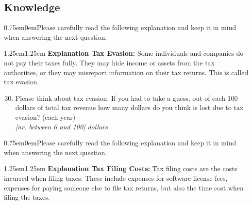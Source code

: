 \documentclass[11pt]{article}
\newcommand{\tk}[1]{\textcolor{orange}{#1}}
\begin{document}
\subsection*{Knowledge}
\begin{adjustwidth}{0.75em}{0em}Please carefully read the following explanation and keep it in mind when answering the next question.\end{adjustwidth} 
\vspace{0.5em}
\begin{adjustwidth}{1.25em}{1.25em} 
\textbf{Explanation Tax Evasion:} Some individuals and companies do not pay their taxes fully. They may hide income or assets from the tax authorities, or they may misreport information on their tax returns. This is called tax evasion. 
\end{adjustwidth}
\begin{enumerate}[resume]
    \setcounter{enumi}{29}
    \item Please think about tax evasion. If you had to take a guess, out of each 100 dollars of total tax revenue how many dollars do you think is lost due to tax evasion? (each year) \\
    \textit{[nr. between 0 and 100] dollars} 
\end{enumerate}
\begin{adjustwidth}{0.75em}{0em}Please carefully read the following explanation and keep it in mind when answering the next question.\end{adjustwidth}
\vspace{0.5em}
\begin{adjustwidth}{1.25em}{1.25em} \textbf{Explanation Tax Filing Costs:} Tax filing costs are the costs incurred when filing taxes. These include expenses for software license fees, expenses for paying someone else to file tax returns, but also the time cost when filing the taxes. 
\end{adjustwidth}
\vspace{0.5em}
\end{document}
